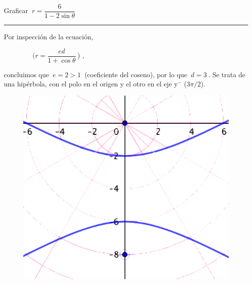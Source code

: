 \begin{miejercicio} 
	

Graficar $\  r=\dfrac{6}{1-2 \sin \theta} $ 

\rule{300pt}{0.2pt}

\begin{multicols}{2}
Por inspección de la ecuación, 

\textcolor{gris}{$\ \qquad \qquad (r=\dfrac{ed}{1+\cos \theta} \ $) },

concluimos que $\ e=2>1\ $ (coeficiente del coseno), por lo que $\ d=3 \ $. Se trata de una hipérbola, con el polo en el origen y el otro en el eje y$^-$ ($3\pi/2$).
\begin{figure}[H]
	\centering
	\includegraphics[width=.25\textwidth]{img-polares/polares47.png}
\end{figure}
\vspace{2mm}
\end{multicols}

\end{miejercicio}	







